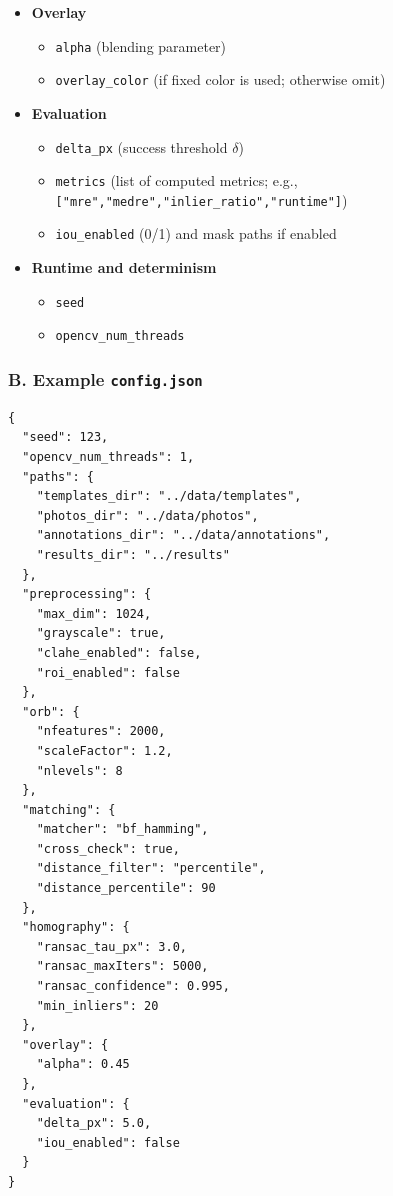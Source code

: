 \begin{itemize}
  \item \textbf{Overlay}
  \begin{itemize}
    \item \texttt{alpha} (blending parameter)
    \item \texttt{overlay\_color} (if fixed color is used; otherwise omit)
  \end{itemize}

  \item \textbf{Evaluation}
  \begin{itemize}
    \item \texttt{delta\_px} (success threshold $\delta$)
    \item \texttt{metrics} (list of computed metrics; e.g., \texttt{["mre","medre","inlier\_ratio","runtime"]})
    \item \texttt{iou\_enabled} (0/1) and mask paths if enabled
  \end{itemize}

  \item \textbf{Runtime and determinism}
  \begin{itemize}
    \item \texttt{seed}
    \item \texttt{opencv\_num\_threads}
  \end{itemize}
\end{itemize}

\subsubsection*{B. Example \texttt{config.json}}
\begin{verbatim}
{
  "seed": 123,
  "opencv_num_threads": 1,
  "paths": {
    "templates_dir": "../data/templates",
    "photos_dir": "../data/photos",
    "annotations_dir": "../data/annotations",
    "results_dir": "../results"
  },
  "preprocessing": {
    "max_dim": 1024,
    "grayscale": true,
    "clahe_enabled": false,
    "roi_enabled": false
  },
  "orb": {
    "nfeatures": 2000,
    "scaleFactor": 1.2,
    "nlevels": 8
  },
  "matching": {
    "matcher": "bf_hamming",
    "cross_check": true,
    "distance_filter": "percentile",
    "distance_percentile": 90
  },
  "homography": {
    "ransac_tau_px": 3.0,
    "ransac_maxIters": 5000,
    "ransac_confidence": 0.995,
    "min_inliers": 20
  },
  "overlay": {
    "alpha": 0.45
  },
  "evaluation": {
    "delta_px": 5.0,
    "iou_enabled": false
  }
}
\end{verbatim}

